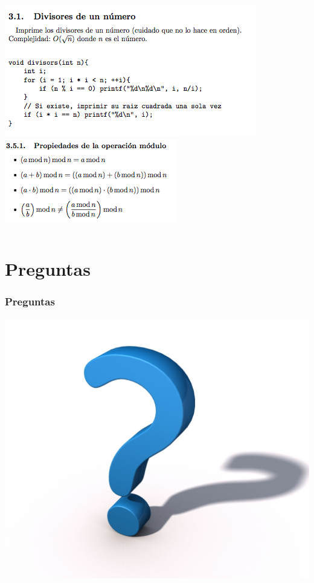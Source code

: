\documentclass{beamer}
\begin{document}
	\begin{frame}
		\begin{columns}[T]
				\includegraphics[width = \textwidth]{./img/manual2.png}
				\includegraphics[width = \textwidth]{./img/manual3.png}
		\end{columns}
	\end{frame}

\section{Preguntas}
	\begin{frame}
		\frametitle{Preguntas}
		\includegraphics[height = \textheight]{./img/preguntas.jpeg}
	\end{frame}
\end{document}
